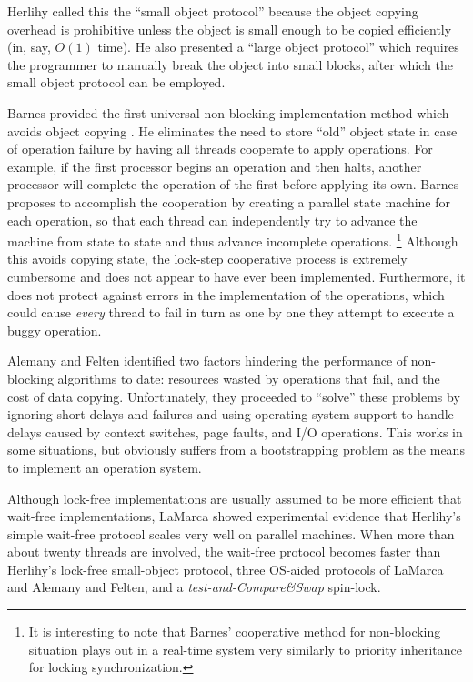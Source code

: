 \documentclass[12pt,twoside]{article}
\newcommand{\punt}[1]{}%
\newcommand{\secref}[1]         {Section~\ref{sec:#1}}
\begin{document}
Herlihy called this the ``small object protocol'' because the object
copying overhead is prohibitive unless the object is small enough to
be copied efficiently (in, say, $O(1)$ time).  He also presented a
``large object protocol'' which requires the programmer to
manually break the object into small blocks, after which the small
object protocol can be employed. 
\punt{ This trouble with large objects is
common to many non-blocking implementations; our solution is presented
in \secref{proposal}.}

Barnes provided the first universal non-blocking implementation
method which avoids object copying \cite{Barnes93}.  He eliminates the
need to store ``old'' object
state in case of operation failure by having all threads cooperate to
apply operations.  For example, if the first processor begins an operation
and then halts, another processor will complete the operation of the first
before applying its own.  Barnes proposes to accomplish the
cooperation by creating a parallel state machine for each operation,
so that each thread can independently try to advance the machine from state
to state and thus advance incomplete operations.%
\footnote{It is interesting to note that Barnes' cooperative method
  for non-blocking 
  situation plays out in a real-time system very similarly to priority
  inheritance for locking synchronization.}
Although this avoids
copying state, the lock-step cooperative process is extremely
cumbersome and does not appear to have ever been implemented.
Furthermore, it does not protect against errors in the implementation
of the operations, which could cause \emph{every} thread to fail in turn
as one by one they attempt to execute a buggy operation.

Alemany and Felten \cite{AlemanyFe92} identified two factors hindering the
performance of non-blocking algorithms to date: resources wasted by operations
that fail, and the cost of data copying.  Unfortunately, they
proceeded to
``solve'' these problems by ignoring short delays and failures and
using operating system support to handle delays caused by
context switches, page faults, and
I/O operations.  This works in some situations, but obviously suffers
from a bootstrapping problem as the means to implement an operation system.

Although lock-free implementations are usually assumed to be more
efficient that wait-free implementations, LaMarca \cite{LaMarca94}
showed experimental evidence that Herlihy's simple
wait-free protocol scales very well on parallel machines.
When more than about twenty threads are involved, the wait-free
protocol becomes
faster than Herlihy's lock-free small-object protocol, three OS-aided
protocols of LaMarca and Alemany and Felten, and a
\emph{test-and-Compare\&Swap} spin-lock.
\end{document}
